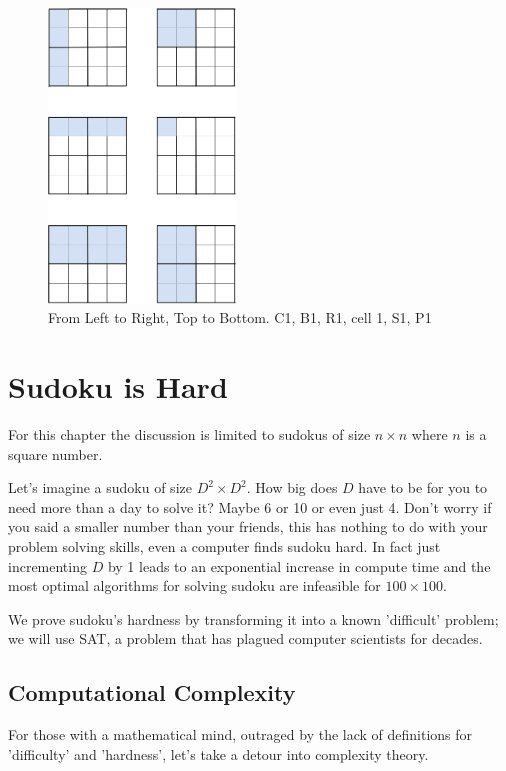 \documentclass[a4paper,11pt]{report}
\begin{document}
\begin{figure}[h!]
	\begin{center}
		\includegraphics[width=50mm]{figures/highlighted_cells.png}
	\end{center}
	\caption{\label{fig:labels}From Left to Right, Top to Bottom. C1, B1, R1, cell 1, S1, P1 }
\end{figure}

\chapter{Sudoku is Hard}

For this chapter the discussion is limited to sudokus of size $n \times n$ where $n$ is a square number.

Let's imagine a sudoku of size $D^2\times D^2$. How big does $D$ have to be for you to need more than a day to solve it? Maybe 6 or 10 or even just 4. Don't worry if you said a smaller number than your friends, this has nothing to do with your problem solving skills, even a computer finds sudoku hard. In fact just incrementing $D$ by 1 leads to an exponential increase in compute time and the most optimal algorithms for solving sudoku are infeasible for $100 \times 100$.

We prove sudoku's hardness by transforming it into a known 'difficult' problem; we will use SAT, a problem that has plagued computer scientists for decades.

\section{Computational Complexity}

For those with a mathematical mind, outraged by the lack of definitions for 'difficulty' and 'hardness', let's take a detour into complexity theory.
\end{document}
